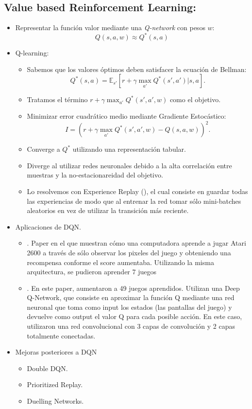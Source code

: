 \documentclass[11pt]{article}
\theoremstyle{plain}
\begin{document}
\subsection{Value based Reinforcement Learning:}
	\begin{itemize}
	   \item Representar la función valor mediante una \textit{Q-network} con pesos $w$:
	   \[Q(s,a,w) \approx Q^\ast(s,a) \]
	   \item Q-learning:
        \begin{itemize}	  
        	\item  Sabemos que los valores óptimos deben satisfacer la ecuación de Bellman:
        	\[ Q^\ast(s,a)=\mathbb{E}_{s'}[r + \gamma \max_{a'} Q^\ast(s',a')|s,a]. \]
        	\item Tratamos el término $r + \gamma \max_{a'} Q^\ast(s',a',w)$ como el objetivo.
        	\item Minimizar error cuadrático medio mediante Gradiente Estocástico:
        	\[ I = (r + \gamma \max_{a'} Q^\ast(s',a',w) - Q(s,a,w))^2. \]
        	\item Converge a $Q^\ast$ utilizando una representación tabular.
        	\item Diverge al utilizar redes neuronales debido a la alta correlación entre muestras y la no-estacionareidad del objetivo.
        	\item Lo resolvemos con Experience Replay (\cite{Lin1992}),  el cual consiste en guardar todas las experiencias de modo que al entrenar la red tomar sólo mini-batches aleatorios  en vez de utilizar la transición más reciente.
	    \end{itemize}
	\item Aplicaciones de DQN.
		\begin{itemize}
			\item \cite{mnih2013playing}. Paper en el que muestran cómo una computadora aprende a jugar Atari 2600 a través de sólo observar los pixeles del juego y obteniendo una 																		recompensa conforme el score aumentaba. Utilizando la misma arquitectura, se pudieron aprender 7 juegos
			\item \cite{mnih2015human}. En este paper, aumentaron a 49 juegos aprendidos. Utilizan una Deep Q-Network, que consiste en aproximar la función Q mediante una red 																			neuronal que toma como input los estados (las pantallas del juego) y devuelve como output el valor Q para cada posible acción. En este caso, 																			utilizaron una red convolucional con 3 capas de convolución y 2 capas totalmente conectadas.
	  \end{itemize}
\item Mejoras posteriores a DQN
   	   \begin{itemize}
   	   		\item Double DQN.
   	   		\item Prioritized Replay.
   	   		\item Duelling Networks.
   	   \end{itemize}
    	 \end{itemize}  	   
\end{document}
